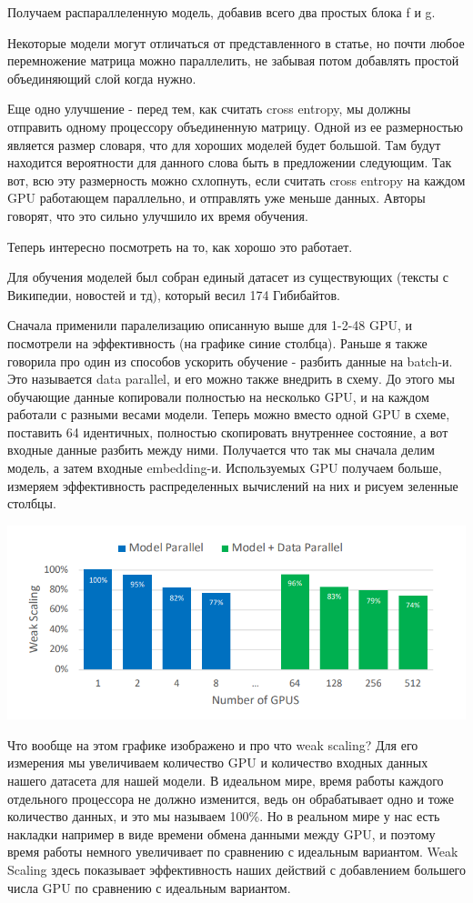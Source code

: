 Получаем распараллеленную модель, добавив всего два простых блока f и g.


Некоторые модели могут отличаться от представленного в статье, но почти любое перемножение матрица можно параллелить, не забывая потом добавлять простой объединяющий слой когда нужно. 

Еще одно  улучшение - перед тем, как считать cross entropy, мы должны отправить одному процессору объединенную матрицу. Одной из ее размерностью является размер словаря, что для хороших моделей будет большой. Там будут находится вероятности для данного слова быть в предложении следующим. Так вот, всю эту размерность можно схлопнуть, если считать  cross entropy на каждом GPU работающем параллельно, и отправлять уже меньше данных. Авторы говорят, что это сильно улучшило их время обучения. 

Теперь интересно посмотреть на то, как хорошо это работает.

Для обучения моделей был собран единый датасет из существующих (тексты с Википедии, новостей и тд), который весил 174 Гибибайтов. 

Сначала применили паралелизацию описанную выше для 1-2-48 GPU, и посмотрели на эффективность (на графике синие столбца). Раньше я также говорила про один из способов ускорить обучение - разбить данные на batch-и. Это называется data parallel, и его можно также внедрить в схему. До этого мы обучающие данные копировали полностью на несколько GPU, и на каждом работали с разными весами модели. Теперь можно вместо одной GPU в схеме, поставить 64 идентичных, полностью скопировать внутреннее состояние, а вот входные данные разбить между ними. Получается что так мы сначала делим модель, а затем входные embedding-и. Используемых GPU получаем больше, измеряем эффективность распределенных вычислений на них и рисуем зеленные столбцы.

\includegraphics[width=0.8\linewidth]{images/TP_weak_scaling.png}

Что вообще на этом графике изображено и про что weak scaling? Для его измерения мы увеличиваем количество GPU и количество входных данных нашего датасета для нашей модели. В идеальном мире, время работы каждого отдельного процессора не должно изменится, ведь он обрабатывает одно и тоже количество данных, и это мы называем 100\%. Но в реальном мире у нас есть накладки например в виде времени обмена данными между GPU, и поэтому время работы немного увеличивает по сравнению с идеальным вариантом. Weak Scaling здесь показывает эффективность наших действий с добавлением большего числа GPU по сравнению с идеальным вариантом.

